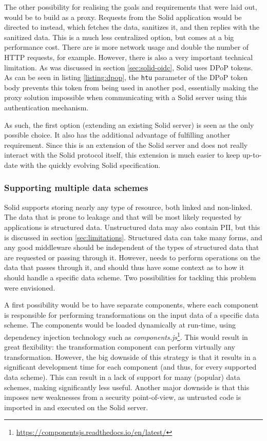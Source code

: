 The other possibility for realising the goals and requirements that were laid out, would be to build \middleware{} as a proxy. Requests from the Solid application would be directed to \middleware{} instead, which fetches the data, sanitizes it, and then replies with the sanitized data. This is a much less centralized option, but comes at a big performance cost. There are is more network usage and double the number of HTTP requests, for example. However, there is also a very important technical limitation. As was discussed in section \ref{sec:solid-oidc}, Solid uses \gls{DPoP} tokens. As can be seen in listing \ref{listing:dpop}, the \texttt{htu} parameter of the \gls{DPoP} token body prevents this token from being used in another pod, essentially making the proxy solution impossible when communicating with a Solid server using this authentication mechanism.

As such, the first option (extending an existing Solid server) is seen as the only possible choice. It also has the additional advantage of fulfilling another requirement. Since this is an extension of the Solid server and does not really interact with the Solid protocol itself, this extension is much easier to keep up-to-date with the quickly evolving Solid specification.

\subsubsection{Supporting multiple data schemes}
Solid supports storing nearly any type of resource, both linked and non-linked. The data that is prone to leakage and that will be most likely requested by applications is structured data. Unstructured data may also contain \gls{PII}, but this is discussed in section \ref{sec:limitations}. Structured data can take many forms, and any good middleware should be independent of the types of structured data that are requested or passing through it. However, \middleware{} needs to perform operations on the data that passes through it, and should thus have some context as to how it should handle a specific data scheme. Two possibilities for tackling this problem were envisioned.

A first possibility would be to have separate components, where each component is responsible for performing transformations on the input data of a specific data scheme. The components would be loaded dynamically at run-time, using dependency injection technology such as \textit{components.js}\footnote{\url{https://componentsjs.readthedocs.io/en/latest/}}. This would result in great flexibility: the transformation component can perform virtually any transformation. However, the big downside of this strategy is that it results in a significant development time for each component (and thus, for every supported data scheme). This can result in a lack of support for many (popular) data schemes, making \middleware{} significantly less useful. Another major downside is that this imposes new weaknesses from a security point-of-view, as untrusted code is imported in and executed on the Solid server.

